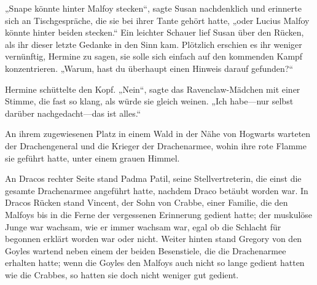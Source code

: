 „Snape könnte hinter Malfoy stecken“, sagte Susan nachdenklich und erinnerte sich an Tischgespräche, die sie bei ihrer Tante gehört hatte, „oder Lucius Malfoy könnte hinter beiden stecken.“ Ein leichter Schauer lief Susan über den Rücken, als ihr dieser letzte Gedanke in den Sinn kam. Plötzlich erschien es ihr weniger vernünftig, Hermine zu sagen, sie solle sich einfach auf den kommenden Kampf konzentrieren. „Warum, hast du überhaupt einen Hinweis darauf gefunden?“

Hermine schüttelte den Kopf. „Nein“, sagte das Ravenclaw-Mädchen mit einer Stimme, die fast so klang, als würde sie gleich weinen. „Ich habe—nur selbst darüber nachgedacht—das ist alles.“

\later

An ihrem zugewiesenen Platz in einem Wald in der Nähe von Hogwarts warteten der Drachengeneral und die Krieger der Drachenarmee, wohin ihre rote Flamme sie geführt hatte, unter einem grauen Himmel.

An Dracos rechter Seite stand Padma Patil, seine Stellvertreterin, die einst die gesamte Drachenarmee angeführt hatte, nachdem Draco betäubt worden war. In Dracos Rücken stand Vincent, der Sohn von Crabbe, einer Familie, die den Malfoys bis in die Ferne der vergessenen Erinnerung gedient hatte; der muskulöse Junge war wachsam, wie er immer wachsam war, egal ob die Schlacht für begonnen erklärt worden war oder nicht. Weiter hinten stand Gregory von den Goyles wartend neben einem der beiden Besenstiele, die die Drachenarmee erhalten hatte; wenn die Goyles den Malfoys auch nicht so lange gedient hatten wie die Crabbes, so hatten sie doch nicht weniger gut gedient.

